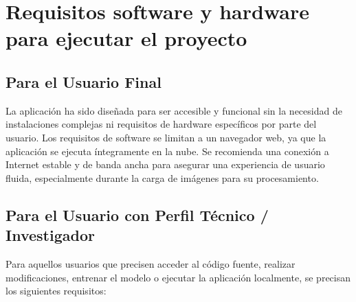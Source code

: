 
\section{Requisitos software y hardware para ejecutar el proyecto}

\subsection{Para el Usuario Final} 
La aplicación ha sido diseñada para ser accesible y funcional sin la necesidad de instalaciones complejas ni requisitos de hardware específicos por parte del usuario. Los requisitos de software se limitan a un navegador web, ya que la aplicación se ejecuta íntegramente en la nube. Se recomienda una conexión a Internet estable y de banda ancha para asegurar una experiencia de usuario fluida, especialmente durante la carga de imágenes para su procesamiento.

\subsection{Para el Usuario con Perfil Técnico / Investigador}
Para aquellos usuarios que precisen acceder al código fuente, realizar modificaciones, entrenar el modelo o ejecutar la aplicación localmente, se precisan los siguientes requisitos:

